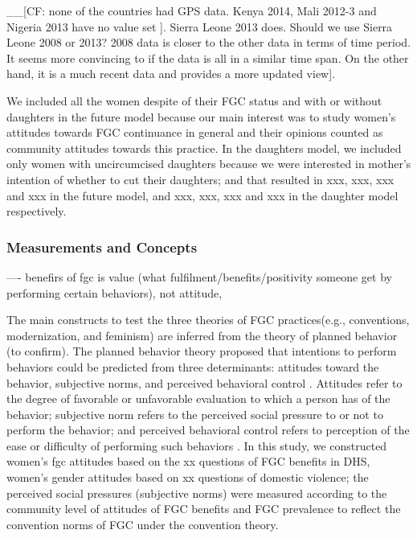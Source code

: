 \documentclass[12pt,]{article}
\begin{document}
\_\_{[}CF: none of the countries had GPS data.  Kenya 2014, Mali 2012-3 and Nigeria 2013 have no value set {]}.  Sierra Leone 2013 does.  Should we use Sierra Leone 2008 or 2013? 2008 data is closer to the other data in terms of time period. It seems more convincing to if the data is all in a similar time span.  On the other hand, it is a much recent data and provides a more updated view{]}. 

We included all the women despite of their FGC status and with or without daughters in the future model because our main interest was to study women's attitudes towards FGC continuance in general and their opinions counted as community attitudes towards this practice.  In the daughters model, we included only women with uncircumcised daughters because we were interested in mother's intention of whether to cut their daughters; and that resulted in xxx, xxx, xxx and xxx in the future model, and xxx, xxx, xxx and xxx in the daughter model respectively.


\subsubsection{Measurements and Concepts}\label{measurements-and-concepts}
---- benefirs of fgc is value (what fulfilment/benefits/positivity someone get by performing certain behaviors), not attitude,

The main constructs to test the three theories of FGC practices(e.g., conventions, modernization, and feminism) are inferred from the theory of planned behavior \cite{Ajze91, Ajze02, ThomMadd92} (to confirm).  The planned behavior theory proposed that intentions to perform behaviors could be predicted from three determinants:  attitudes toward the behavior, subjective norms, and perceived behavioral control \cite{Ajze91}.  Attitudes refer to the degree of favorable or unfavorable evaluation to which a person has of the behavior; subjective norm refers to the perceived social pressure to or not to perform the behavior; and perceived behavioral control refers to perception of the ease or difficulty of performing such behaviors \cite{Ajze91}.  In this study, we constructed women's fgc attitudes based on the xx questions of FGC benefits in DHS, women's gender attitudes based on xx questions of domestic violence; the perceived social pressures (subjective norms) were measured according to the community level of attitudes of FGC benefits and FGC prevalence to reflect the convention norms of FGC under the convention theory.
\end{document}
